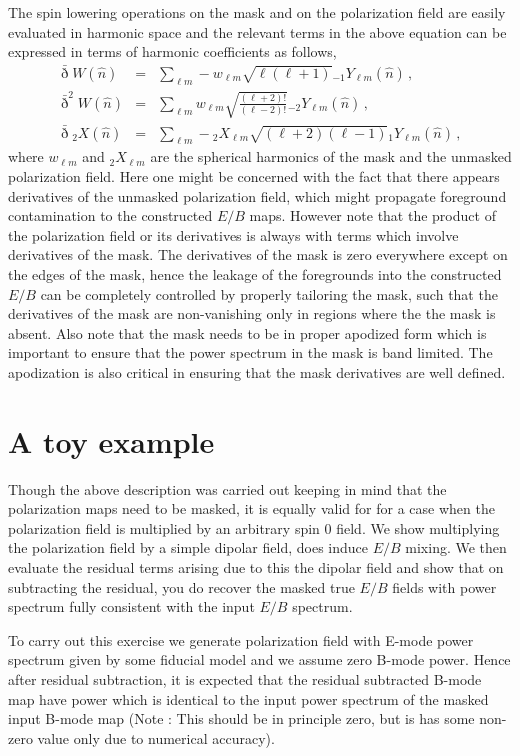 \documentclass[prd,amsmath,amssymb,floatfix,nofootinbib,preprintnumbers,twocolumn]{revtex4}%
\newcommand{\beqry}{\begin{eqnarray}}
\newcommand{\eeqry}{\end{eqnarray}}
\begin{document}
The spin lowering operations on the mask and on the polarization field are easily evaluated in harmonic space and the relevant terms in the above equation can be expressed in terms of harmonic coefficients as follows,
%
\beqry
\bar{\eth} W(\hat{n}) &=&\sum_{\ell m} - w_{\ell m} \sqrt{\ell(\ell+1)}  {_{-1}} Y_{\ell m}(\hat{n}) \,, \\
\bar{\eth}^2 W(\hat{n}) &=& \sum_{\ell m} w_{\ell m} \sqrt{\frac{(\ell+2)!}{(\ell -2)!}}  {_{-2}} Y_{\ell m}(\hat{n})  \,, \\
\bar{\eth} {_{2}}X(\hat{n}) &=&\sum_{\ell m} - {_{2}}X_{\ell m} \sqrt{(\ell+2)(\ell-1)}  {_{1}} Y_{\ell m}(\hat{n}) \,,
\eeqry
%
where $w_{\ell m}$ and $_{2}X_{\ell m}$ are the spherical harmonics of the mask and the unmasked polarization field. Here one might be concerned with the fact that there appears derivatives of the unmasked polarization field, which might propagate foreground contamination to the constructed $E/B$ maps. However note that the product of the polarization field or its derivatives is always with terms which involve derivatives of the mask.  The derivatives of the mask is zero everywhere except on the edges of the mask, hence the leakage  of the foregrounds into the constructed $E/B$ can be completely controlled by properly tailoring the mask, such that the derivatives of the mask are non-vanishing only in regions where the the mask is absent. Also note that the mask needs to be in proper apodized form which is important to ensure that the power spectrum in the mask is band limited.  The apodization is also critical in ensuring that the mask derivatives are well defined. 

\section{A toy example}

Though the above description was carried out keeping in mind that the polarization maps need to be masked, it is equally valid for for a case when the polarization field is multiplied by an arbitrary spin 0 field. We show multiplying the polarization field by a simple dipolar field, does induce $E/B$ mixing. We then evaluate the residual terms arising due to this the dipolar field and show that on subtracting the residual, you do recover the masked true $E/B$ fields with power spectrum fully consistent with the input $E/B$ spectrum.

To carry out this exercise we generate polarization field with E-mode power spectrum given by some fiducial model and we assume zero B-mode power. Hence after residual subtraction, it is expected that the residual subtracted B-mode map have power which is identical to the input  power spectrum of the masked input B-mode map (Note : This should be in principle zero, but is has some non-zero value only due to numerical accuracy). 
\end{document}
